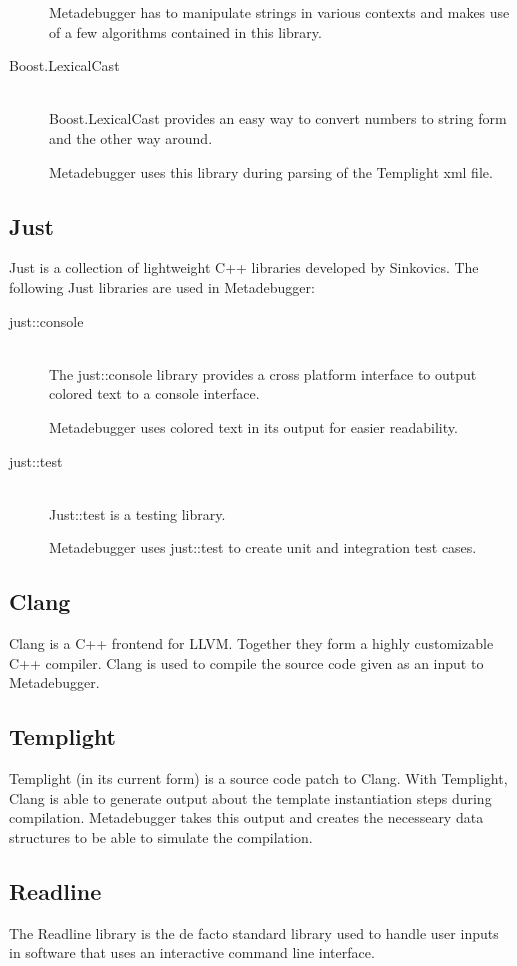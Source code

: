 \begin{description}
        Metadebugger has to manipulate strings in various contexts and makes
        use of a few algorithms contained in this library.
    \item[Boost.LexicalCast]\cite{boost-lexicalcast} \hfill \\
        Boost.LexicalCast provides an easy way to convert numbers to string
        form and the other way around.

        Metadebugger uses this library during parsing of the Templight xml
        file.

\end{description}

\subsection{Just\cite{just}}

Just is a collection of lightweight C++ libraries developed by Sinkovics. The
following Just libraries are used in Metadebugger:
\begin{description}
    \item[just::console] \hfill \\
        The just::console library provides a cross platform interface to output
        colored text to a console interface.

        Metadebugger uses colored text in its output for easier readability.
    \item[just::test] \hfill \\
        Just::test is a testing library.

        Metadebugger uses just::test to create unit and integration test cases.
\end{description}

\subsection{Clang\cite{clang}}

Clang is a C++ frontend for LLVM. Together they form a highly customizable C++
compiler. Clang is used to compile the source code given as an input to
Metadebugger.

\subsection{Templight\cite{templight}}

Templight (in its current form) is a source code patch to Clang. With
Templight, Clang is able to generate output about the template instantiation
steps during compilation. Metadebugger takes this output and creates the
necesseary data structures to be able to simulate the compilation.

\subsection{Readline\cite{readline}}

The Readline library is the de facto standard library used to handle user
inputs in software that uses an interactive command line interface.

